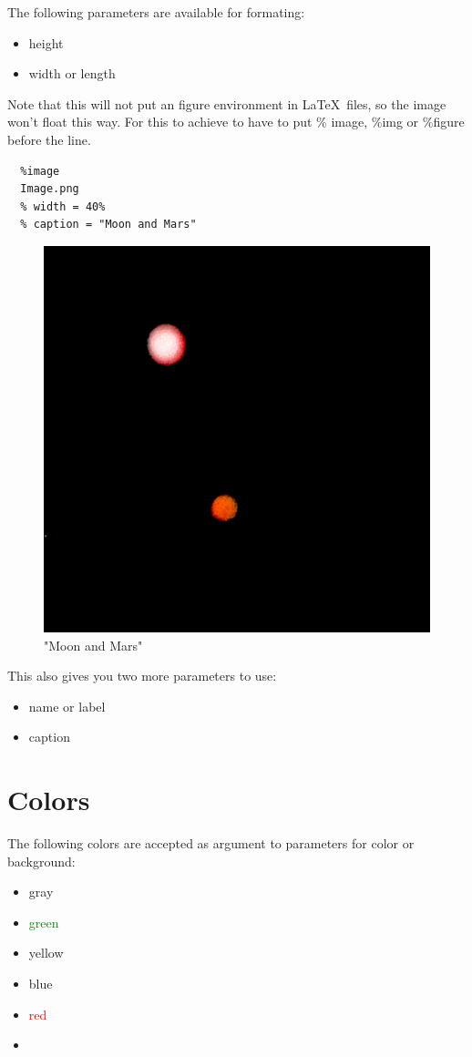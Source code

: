 \documentclass{article}
\begin{document}
{The following parameters are available for formating:\\}

\begin{itemize}
\item height
\item width or length
\end{itemize}


{Note that this will not put an figure environment in \LaTeX\ 
files, so the image won't float this way. For this to
achieve to have to put \% image, \%img or \%figure before the
line.\\}

\begin{verbatim}
  %image
  Image.png
  % width = 40%
  % caption = "Moon and Mars"
\end{verbatim}


\begin{figure}[hbt]
\includegraphics[width=.40\linewidth]{Image.png}
\caption{"Moon and Mars"}
\end{figure}


{This also gives you two more parameters to use:\\}

\begin{itemize}
\item name or label
\item caption
\end{itemize}


\section{Colors}

{The following colors are accepted as argument to parameters
for color or background:\\}

\colorbox{gray!75}{\parbox{\linewidth}{%
\begin{itemize}
\item gray
\item \textcolor{green}{green}
\item \textcolor{LightYellow1}{yellow}
\item \textcolor{PaleTurquoise1}{blue}
\item \textcolor{red}{red}
\item \textcolor{white}{white}
\end{itemize}

}
}
\end{document}
